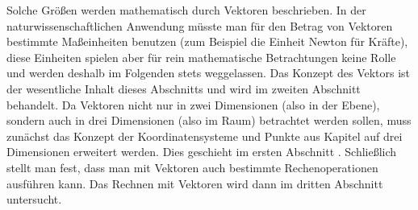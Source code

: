 \begin{MIntro}
Solche Größen werden mathematisch durch Vektoren beschrieben. In der naturwissenschaftlichen Anwendung müsste man für den Betrag von Vektoren bestimmte Maßeinheiten benutzen (zum Beispiel die Einheit Newton  für Kräfte), diese Einheiten spielen aber für rein mathematische Betrachtungen keine Rolle und werden deshalb im Folgenden stets weggelassen. Das Konzept des Vektors ist der wesentliche Inhalt dieses Abschnitts und wird im zweiten Abschnitt  behandelt. Da Vektoren nicht nur in zwei Dimensionen (also in der Ebene), sondern auch in drei Dimensionen (also im Raum) betrachtet werden sollen, muss zunächst das Konzept der Koordinatensysteme und Punkte aus Kapitel  auf drei Dimensionen erweitert werden. Dies geschieht im ersten Abschnitt . Schließlich stellt man fest, dass man mit Vektoren auch bestimmte Rechenoperationen ausführen kann. Das Rechnen mit Vektoren wird dann im dritten Abschnitt  untersucht.    
\end{MIntro}

